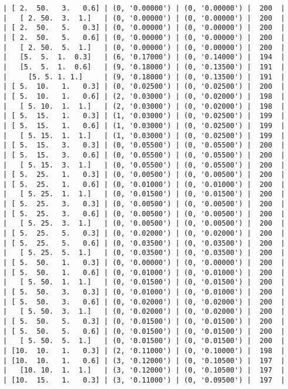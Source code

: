 \documentclass{article}
\begin{document}
\begin{verbatim}
| [ 2.  50.   3.   0.6] | (0, '0.00000') | (0, '0.00000') |  200  |
|   [ 2. 50.  3.  1.]   | (0, '0.00000') | (0, '0.00000') |  200  |
| [ 2.  50.   5.   0.3] | (0, '0.00000') | (0, '0.00000') |  200  |
| [ 2.  50.   5.   0.6] | (0, '0.00000') | (0, '0.00000') |  200  |
|   [ 2. 50.  5.  1.]   | (0, '0.00000') | (0, '0.00000') |  200  |
|   [5.  5.  1.  0.3]   | (6, '0.17000') | (0, '0.14000') |  194  |
|   [5.  5.  1.  0.6]   | (9, '0.18000') | (0, '0.13500') |  191  |
|     [5. 5. 1. 1.]     | (9, '0.18000') | (0, '0.13500') |  191  |
| [ 5.  10.   1.   0.3] | (0, '0.02500') | (0, '0.02500') |  200  |
| [ 5.  10.   1.   0.6] | (2, '0.03000') | (0, '0.02000') |  198  |
|   [ 5. 10.  1.  1.]   | (2, '0.03000') | (0, '0.02000') |  198  |
| [ 5.  15.   1.   0.3] | (1, '0.03000') | (0, '0.02500') |  199  |
| [ 5.  15.   1.   0.6] | (1, '0.03000') | (0, '0.02500') |  199  |
|   [ 5. 15.  1.  1.]   | (1, '0.03000') | (0, '0.02500') |  199  |
| [ 5.  15.   3.   0.3] | (0, '0.05500') | (0, '0.05500') |  200  |
| [ 5.  15.   3.   0.6] | (0, '0.05500') | (0, '0.05500') |  200  |
|   [ 5. 15.  3.  1.]   | (0, '0.05500') | (0, '0.05500') |  200  |
| [ 5.  25.   1.   0.3] | (0, '0.00500') | (0, '0.00500') |  200  |
| [ 5.  25.   1.   0.6] | (0, '0.01000') | (0, '0.01000') |  200  |
|   [ 5. 25.  1.  1.]   | (0, '0.01500') | (0, '0.01500') |  200  |
| [ 5.  25.   3.   0.3] | (0, '0.00500') | (0, '0.00500') |  200  |
| [ 5.  25.   3.   0.6] | (0, '0.00500') | (0, '0.00500') |  200  |
|   [ 5. 25.  3.  1.]   | (0, '0.00500') | (0, '0.00500') |  200  |
| [ 5.  25.   5.   0.3] | (0, '0.02000') | (0, '0.02000') |  200  |
| [ 5.  25.   5.   0.6] | (0, '0.03500') | (0, '0.03500') |  200  |
|   [ 5. 25.  5.  1.]   | (0, '0.03500') | (0, '0.03500') |  200  |
| [ 5.  50.   1.   0.3] | (0, '0.00000') | (0, '0.00000') |  200  |
| [ 5.  50.   1.   0.6] | (0, '0.01000') | (0, '0.01000') |  200  |
|   [ 5. 50.  1.  1.]   | (0, '0.01500') | (0, '0.01500') |  200  |
| [ 5.  50.   3.   0.3] | (0, '0.01000') | (0, '0.01000') |  200  |
| [ 5.  50.   3.   0.6] | (0, '0.02000') | (0, '0.02000') |  200  |
|   [ 5. 50.  3.  1.]   | (0, '0.02000') | (0, '0.02000') |  200  |
| [ 5.  50.   5.   0.3] | (0, '0.01500') | (0, '0.01500') |  200  |
| [ 5.  50.   5.   0.6] | (0, '0.01500') | (0, '0.01500') |  200  |
|   [ 5. 50.  5.  1.]   | (0, '0.01500') | (0, '0.01500') |  200  |
| [10.  10.   1.   0.3] | (2, '0.11000') | (0, '0.10000') |  198  |
| [10.  10.   1.   0.6] | (3, '0.12000') | (0, '0.10500') |  197  |
|   [10. 10.  1.  1.]   | (3, '0.12000') | (0, '0.10500') |  197  |
| [10.  15.   1.   0.3] | (3, '0.11000') | (0, '0.09500') |  197  |

\end{verbatim}
\end{document}
